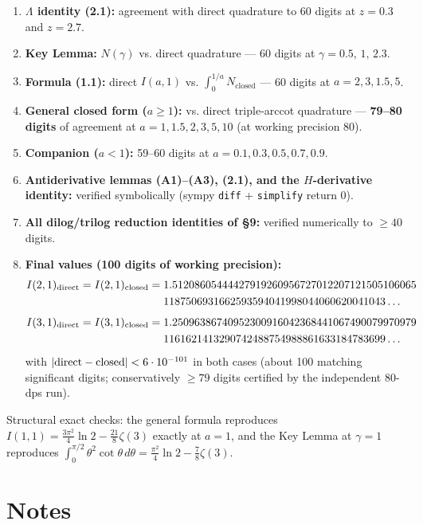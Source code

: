 \documentclass[11pt]{article}
\theoremstyle{remark}
\begin{document}
\begin{enumerate}
\item \textbf{$\Lambda$ identity (2.1):} agreement with direct quadrature to 60 digits at $z=0.3$ and $z=2.7$.
\item \textbf{Key Lemma:} $N(\gamma)$ vs. direct quadrature --- 60 digits at $\gamma=0.5,\,1,\,2.3$.
\item \textbf{Formula (1.1):} direct $I(a,1)$ vs. $\int_0^{1/a}N_{\text{closed}}$ --- 60 digits at $a=2,3,1.5,5$.
\item \textbf{General closed form ($a\ge1$):} vs. direct triple-arccot quadrature --- \textbf{79--80 digits} of agreement at $a=1,1.5,2,3,5,10$ (at working precision 80).
\item \textbf{Companion ($a<1$):} 59--60 digits at $a=0.1,0.3,0.5,0.7,0.9$.
\item \textbf{Antiderivative lemmas (A1)--(A3), (2.1), and the $H$-derivative identity:} verified symbolically (sympy \texttt{diff} + \texttt{simplify} return 0).
\item \textbf{All dilog/trilog reduction identities of \S9:} verified numerically to $\ge40$ digits.
\item \textbf{Final values (100 digits of working precision):}
\[\begin{aligned}
I(2,1)_{\rm direct}=I(2,1)_{\rm closed}=\;&1.51208605444427919260956727012207121505106065\\
&1187506931662593594041998044060620041043\ldots
\end{aligned}\]
\[\begin{aligned}
I(3,1)_{\rm direct}=I(3,1)_{\rm closed}=\;&1.25096386740952300916042368441067490079970979\\
&1161621413290742488754988861633184783699\ldots
\end{aligned}\]
with $|{\rm direct}-{\rm closed}|<6\cdot10^{-101}$ in both cases (about 100 matching significant digits; conservatively $\ge79$ digits certified by the independent 80-dps run).
\end{enumerate}

Structural exact checks: the general formula reproduces $I(1,1)=\frac{3\pi^2}{4}\ln2-\frac{21}{8}\zeta(3)$ exactly at $a=1$, and the Key Lemma at $\gamma=1$ reproduces $\int_0^{\pi/2}\theta^2\cot\theta\,d\theta=\frac{\pi^2}4\ln2-\frac78\zeta(3)$.

\section*{Notes}
\end{document}
